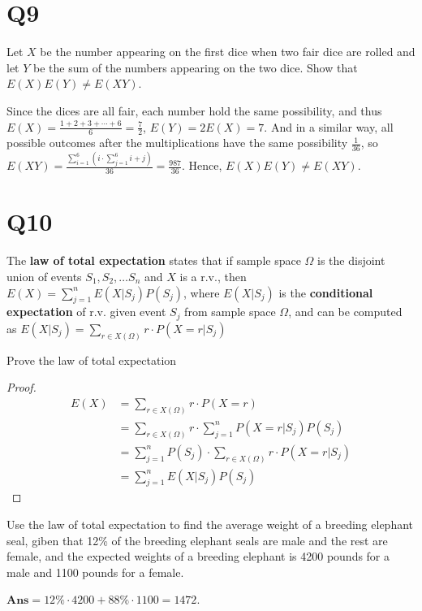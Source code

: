 \documentclass[11pt]{article}
\begin{document}
\section*{Q9}
Let $X$ be the number appearing on the first dice when two fair dice 
are rolled and let $Y$ be the sum of the numbers appearing on 
the two dice. Show that $E(X)E(Y)\neq E(XY)$.
\begin{solution}
    Since the dices are all fair, each number hold the same possibility, and 
    thus $E(X)=\frac{1+2+3+ \cdots +6}{6}=\frac{7}{2}$, $E(Y)=2E(X)=7$.
    And in a similar way, all possible outcomes after the multiplications have the same possibility $\frac{1}{36}$, 
    so $E(XY)=\frac{\sum_{i=1}^{6}\left( i\cdot \sum_{j=1}^{6}i+j \right)}{36}=\frac{987}{36}$. Hence, $E(X)E(Y)\neq E(XY)$.
\end{solution}

\section*{Q10}
The \textbf{law of total expectation} states that if sample space 
$\Omega$ is the disjoint union of events $S_1,S_2, \ldots S_{n}$ 
and $X$ is a r.v., then $E(X)=\sum_{j=1}^{n}E(X \vert S_{j})P(S_{j})$,
where $E(X \vert S_{j})$ is the \textbf{conditional expectation} of 
r.v. given event $S_{j} $ from sample space $\Omega$, and can be computed
as $E(X \vert S_{j})=\sum_{r \in X(\Omega)}r\cdot P(X=r \vert S_{j})$
\begin{qparts}
    
    \item Prove the law of total expectation
    \begin{proof}
        \begin{align*}
            E(X)&=\sum_{r \in X(\Omega)}r\cdot P(X=r)\\
            &=\sum_{r \in X(\Omega)}r\cdot \sum_{j=1}^{n}P(X=r\vert S_{j})P(S_{j})\\
            &=\sum_{j=1}^{n}P(S_{j})\cdot \sum_{r \in X(\Omega)}r\cdot P(X=r\vert S_{j})\\
            &=\sum_{j=1}^{n}E(X\vert S_{j})P(S_{j})
        \end{align*}
    \end{proof}


    \item Use the law of total expectation to find the average weight
    of a breeding elephant seal, giben that 12\% of the breeding elephant
    seals are male and the rest are female, and the expected weights of
    a breeding elephant is 4200 pounds for a male and 1100 pounds for a
    female.
    \begin{solution}
        $\textbf{Ans}=12\%\cdot 4200+88\%\cdot 1100=1472$.
    \end{solution}
\end{qparts}
\end{document}
